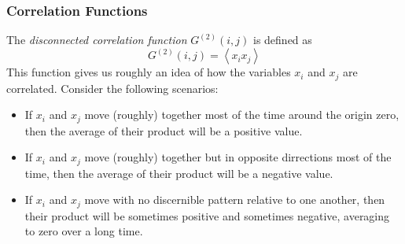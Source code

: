 \documentclass{article}
\begin{document}
\subsubsection{Correlation Functions}
The \emph{disconnected correlation function} $G^{(2)}(i,j)$ is defined as
$$G^{(2)}(i,j) = \left \langle x_{i}x_{j} \right \rangle$$
This function gives us roughly an idea of how the variables $x_{i}$ and $x_{j}$
are correlated. Consider the following scenarios:
\begin{itemize}
\item If $x_{i}$ and $x_{j}$ move (roughly) together most of the time around
the origin zero, then the average of their product will be a positive value.
\item If $x_{i}$ and $x_{j}$ move (roughly) together but in opposite dirrections
most of the time, then the average of their product will be a negative value.
\item If $x_{i}$ and $x_{j}$ move with no discernible pattern relative to one
another, then their product will be sometimes positive and sometimes negative,
averaging to zero over a long time.
\end{itemize}
\end{document}
